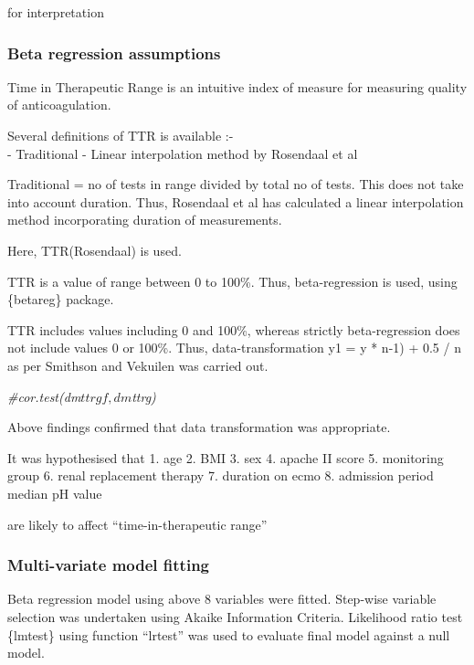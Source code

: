 \documentclass[
]{article}
\newenvironment{Shaded}{\begin{snugshade}}{\end{snugshade}}
\newcommand{\CommentTok}[1]{\textcolor[rgb]{0.56,0.35,0.01}{\textit{#1}}}
\begin{document}
for interpretation

\hypertarget{beta-regression-assumptions}{%
\subsubsection{Beta regression
assumptions}\label{beta-regression-assumptions}}

Time in Therapeutic Range is an intuitive index of measure for measuring
quality of anticoagulation.

Several definitions of TTR is available :-\\
- Traditional - Linear interpolation method by Rosendaal et al

Traditional = no of tests in range divided by total no of tests. This
does not take into account duration. Thus, Rosendaal et al has
calculated a linear interpolation method incorporating duration of
measurements.

Here, TTR(Rosendaal) is used.

TTR is a value of range between 0 to 100\%. Thus, beta-regression is
used, using \{betareg\} package.

TTR includes values including 0 and 100\%, whereas strictly
beta-regression does not include values 0 or 100\%. Thus,
data-transformation y1 = y * n-1) + 0.5 / n as per Smithson and Vekuilen
was carried out.

\begin{Shaded}
\begin{Highlighting}[]
\CommentTok{\#cor.test(dm$ttrgf,dm$ttrg)}
\end{Highlighting}
\end{Shaded}

Above findings confirmed that data transformation was appropriate.

It was hypothesised that 1. age 2. BMI 3. sex 4. apache II score 5.
monitoring group 6. renal replacement therapy 7. duration on ecmo 8.
admission period median pH value

are likely to affect ``time-in-therapeutic range''

\hypertarget{multi-variate-model-fitting}{%
\subsubsection{Multi-variate model
fitting}\label{multi-variate-model-fitting}}

Beta regression model using above 8 variables were fitted. Step-wise
variable selection was undertaken using Akaike Information Criteria.
Likelihood ratio test \{lmtest\} using function ``lrtest'' was used to
evaluate final model against a null model.
\end{document}
